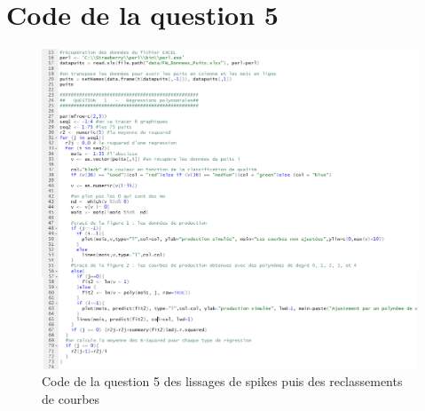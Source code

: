 \documentclass[12pt]{article}
\begin{document}
\section{Code de la question 5}
\begin{figure}[H]
 \centering %
	\includegraphics[width=600px]{code_q1}
  \caption{\label{fig:code_q5} Code de la question 5 des lissages de spikes puis des reclassements de courbes}
\end{figure}
\end{document}
